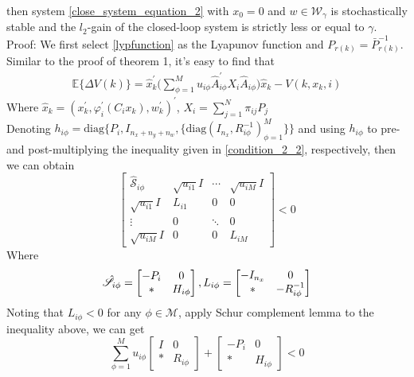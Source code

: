 \documentclass[conference]{IEEEtran}
\begin{document}
then system \eqref{close_system_equation_2}  with $x_0=0$ and $w\in\mathcal{W}_{\gamma}$ is stochastically stable and the $l_2$-gain of the closed-loop system is strictly less or equal to $\gamma$.
\\
Proof: We first select \eqref{lypfunction} as the Lyapunov function and $P_{r(k)}=\bar{P}^{-1}_{r(k)}$. Similar to the proof of theorem 1, it's easy to find that
\begin{equation}
	\begin{split}
		\mathbb{E}\{\varDelta V(k)\}=\hat{x}^{'}_{k} \Big( \sum_{\phi=1}^{M}u_{i\phi}\hat{A}^{'}_{i\phi}X_{i}\hat{A}_{i\phi}\Big) \hat{x}_{k} -V(k,x_k,i)
	\end{split}
\end{equation}
Where $\hat{x}_{k}=(x^{'}_{k},\varphi^{'}_{i}(C_{i}x_{k}),w^{'}_{k})^{'}$, $ X_{i}=\sum_{j=1}^{N}\pi_{ij}P_{j}$ \\
Denoting $h_{i\phi} = \mathrm{diag}\{P_{i}, I_{n_x+n_y+n_w},\{\mathrm{diag}(I_{n_x},R^{-1}_{i\phi})^{M}_{\phi=1} \} \}$ and using $h_{i\phi}$ to pre- and post-multiplying the inequality given in \eqref{condition_2_2}, respectively, then we can obtain \\
\begin{equation}\nonumber
\begin{bmatrix} 
\hat{\mathscr{S}}_{i\phi}&
\sqrt{u_{i1}}I&
\cdots&
\sqrt{u_{iM}}I\\
\sqrt{u_{i1}}I&L_{i1}&0&0\\ 
\vdots&0&\ddots&0\\
\sqrt{u_{iM}}I&0&0&
L_{iM}

\end{bmatrix} <0
\end{equation}
Where 
\begin{equation} \notag
\begin{aligned}
\hat{\mathscr{S}}_{i\phi}=\begin{bmatrix}
-P_{i }&0\\
*&H_{i\phi}
\end{bmatrix},
L_{i\phi} = \begin{bmatrix}
-I_{n_x}&0\\
*&-R^{-1}_{i\phi}
\end{bmatrix}
\end{aligned}
\end{equation}
Noting that $L_{i\phi}<0$ for any $\phi\in \mathcal{M}$, apply Schur complement lemma to the inequality above, we can get \\
\begin{equation} \label{cons2}
\sum_{\phi=1}^{M}u_{i\phi} \begin{bmatrix}
I&0\\
*&R_{i\phi}
\end{bmatrix} + \begin{bmatrix}
-P_{i }&0\\
*&H_{i\phi}
\end{bmatrix} <0
\end{equation}
\end{document}
